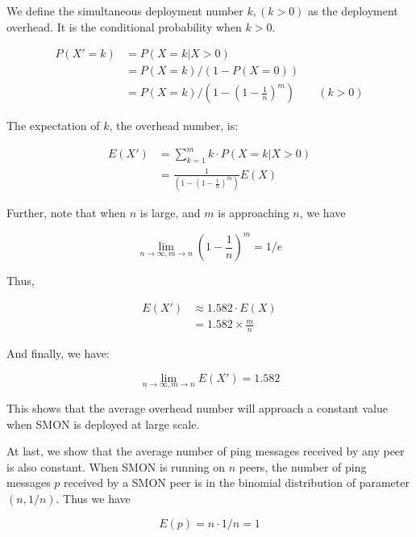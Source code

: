 We define the simultaneous deployment number $k, (k > 0)$ as
the deployment overhead. It is the conditional probability
when $k > 0$.

\begin{equation*}
\begin{aligned}
P(X' = k) &= P(X=k | X > 0) \\
&= P(X = k) / (1 - P(X = 0)) \\ 
&= P(X = k) / (1 - (1 - \frac{1}{n})^{m}) \qquad (k > 0)
\end{aligned}
\end{equation*}

The expectation of $k$, the overhead number, is:

\begin{equation*}
\begin{aligned}
E(X') &= \sum_{k=1}^m k \cdot P(X=k|X>0)  \\
      &= \frac{1}{(1 - (1 - \frac{1}{n})^{m})} E(X)
\end{aligned}
\end{equation*}

Further, note that when $n$ is large, and $m$ is approaching
$n$, we have 

\begin{equation*}
\lim_{n \to \infty, m \to n} (1 - \frac{1}{n})^{m} = 1 / e
\end{equation*}

Thus,

\begin{equation*}
\begin{aligned}
E(X') &\approx 1.582 \cdot E(X) \\
      &= 1.582 \times \frac{m}{n}
\end{aligned}
\end{equation*}

And finally, we have:

\begin{equation*}
\lim_{n \to \infty, m \to n} E(X') = 1.582
\end{equation*}

This shows that the average overhead number will approach a
constant value when SMON is deployed at large scale.

At last, we show that the average number of ping messages
received by any peer is also constant.  When SMON is running
on $n$ peers, the number of ping messages $p$ received by a
SMON peer is in the binomial distribution of parameter $(n,
1/n)$. Thus we have

\begin{equation*}
E(p) = n \cdot 1/n = 1
\end{equation*}





